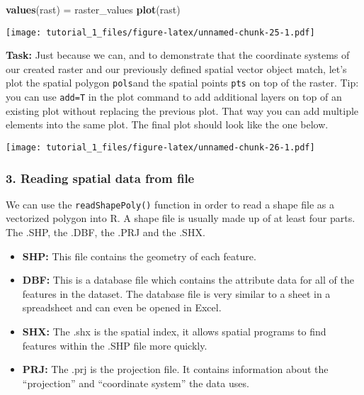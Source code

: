 \documentclass[]{article}
\newenvironment{Shaded}{\begin{snugshade}}{\end{snugshade}}
\newcommand{\KeywordTok}[1]{\textcolor[rgb]{0.13,0.29,0.53}{\textbf{#1}}}
\newcommand{\NormalTok}[1]{#1}
\newcommand{\StringTok}[1]{\textcolor[rgb]{0.31,0.60,0.02}{#1}}
\providecommand{\tightlist}{%
  \setlength{\itemsep}{0pt}\setlength{\parskip}{0pt}}
\begin{document}
\begin{Shaded}
\begin{Highlighting}[]
\KeywordTok{values}\NormalTok{(rast) =}\StringTok{ }\NormalTok{raster_values}
\KeywordTok{plot}\NormalTok{(rast)}
\end{Highlighting}
\end{Shaded}

\texttt{[image: tutorial\_1\_files/figure-latex/unnamed-chunk-25-1.pdf]}

\textbf{Task:} Just because we can, and to demonstrate that the
coordinate systems of our created raster and our previously defined
spatial vector object match, let's plot the spatial polygon
\texttt{pols}and the spatial points \texttt{pts} on top of the raster.
Tip: you can use \texttt{add=T} in the plot command to add additional
layers on top of an existing plot without replacing the previous plot.
That way you can add multiple elements into the same plot. The final
plot should look like the one below.

\texttt{[image: tutorial\_1\_files/figure-latex/unnamed-chunk-26-1.pdf]}

\hypertarget{reading-spatial-data-from-file}{%
\subsubsection{3. Reading spatial data from
file}\label{reading-spatial-data-from-file}}

We can use the \texttt{readShapePoly()} function in order to read a
shape file as a vectorized polygon into R. A shape file is usually made
up of at least four parts. The .SHP, the .DBF, the .PRJ and the .SHX.

\begin{itemize}
\tightlist
\item
  \textbf{SHP:} This file contains the geometry of each feature.
\item
  \textbf{DBF:} This is a database file which contains the attribute
  data for all of the features in the dataset. The database file is very
  similar to a sheet in a spreadsheet and can even be opened in Excel.
\item
  \textbf{SHX:} The .shx is the spatial index, it allows spatial
  programs to find features within the .SHP file more quickly.
\item
  \textbf{PRJ:} The .prj is the projection file. It contains information
  about the ``projection'' and ``coordinate system'' the data uses.
\end{itemize}
\end{document}
